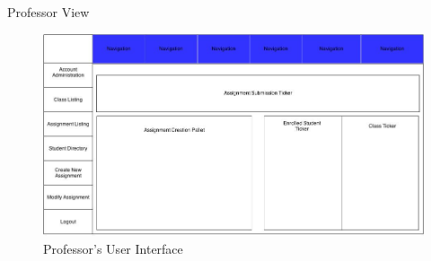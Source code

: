     \newpage
    \iffalse
    \begin{section}{Professor View}
        \begin{figure}[h!]
                \centerline{\includegraphics[width=13cm]{ProfessorView.jpg}}
                \caption{Professor's User Interface}
        \end{figure}
    \end{section}
    \newpage

